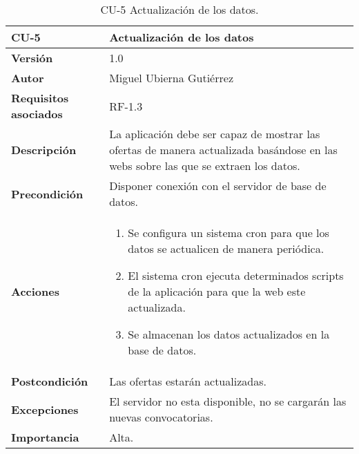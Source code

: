 \begin{table}[p]
	\centering
	\begin{tabularx}{\linewidth}{ p{} p{} }
		\toprule
		\textbf{CU-5}    & \textbf{Actualización de los datos}\\
		\toprule
		\textbf{Versión}              & 1.0    \\
		\textbf{Autor}                & Miguel Ubierna Gutiérrez \\
		\textbf{Requisitos asociados} & RF-1.3 \\
		\textbf{Descripción}          & La aplicación debe ser capaz de mostrar las ofertas de manera actualizada basándose en las webs sobre las que se extraen los datos. \\
		\textbf{Precondición}         & Disponer conexión con el servidor de base de datos.\\
		\textbf{Acciones}             &
		\begin{enumerate}
			\def\labelenumi{\arabic{enumi}.}
			\tightlist
			\item Se configura un sistema cron para que los datos se actualicen de manera periódica.
			\item El sistema cron ejecuta determinados scripts de la aplicación para que la web este actualizada.
                \item Se almacenan los datos actualizados en la base de datos.
		\end{enumerate}\\
		\textbf{Postcondición}        & Las ofertas estarán actualizadas. \\
		\textbf{Excepciones}          & El servidor no esta disponible, no se cargarán las nuevas convocatorias.  \\
		\textbf{Importancia}          & Alta.  \\
		\bottomrule
	\end{tabularx}
	\caption{CU-5 Actualización de los datos.}
\end{table}


